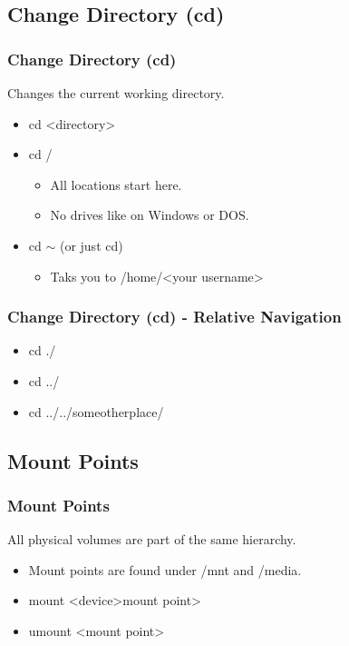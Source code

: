 \documentclass[hyperref={pdfpagelabels=false}]{beamer}
\begin{document}
\subsection{Change Directory (cd)}
\frame
{
    \frametitle{Change Directory (cd)}
    Changes the current working directory.
    \begin{itemize}
    \item{cd {\textless}directory\textgreater}
    \item{cd /}
        \begin{itemize}
        \item{All locations start here.}
        \item{No drives like on Windows or DOS.}
        \end{itemize}
    \item{cd $\sim$ (or just cd)}
        \begin{itemize}
        \item{Taks you to /home/{\textless}your username\textgreater}
        \end{itemize}
    \end{itemize}
}
\frame
{
    \frametitle{Change Directory (cd) - Relative Navigation}
    \begin{itemize}
    \item{cd ./}
    \item{cd ../}
    \item{cd ../../someotherplace/}
    \end{itemize}
}
\subsection{Mount Points}
\frame
{
    \frametitle{Mount Points}
    All physical volumes are part of the same hierarchy.
    \begin{itemize}
    \item{Mount points are found under /mnt and /media.}
    \item{mount {\textless}device\textgreater\hspace{.5 pc}{\textless}mount point\textgreater\hspace{.5 pc}}
    \item{umount {\textless}mount point\textgreater\hspace{.5 pc}}
    \end{itemize}
}
\end{document}
